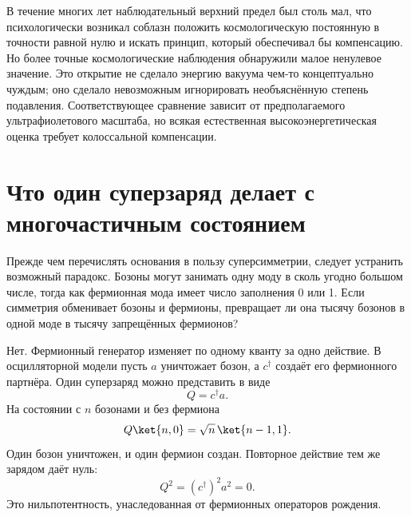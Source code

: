 \begin{classroomqa}
\end{classroomqa}

В течение многих лет наблюдательный верхний предел был столь мал, что психологически возникал соблазн положить космологическую постоянную в точности равной нулю и искать принцип, который обеспечивал бы компенсацию. Но более точные космологические наблюдения обнаружили малое ненулевое значение. Это открытие не сделало энергию вакуума чем-то концептуально чуждым; оно сделало невозможным игнорировать необъяснённую степень подавления. Соответствующее сравнение зависит от предполагаемого ультрафиолетового масштаба, но всякая естественная высокоэнергетическая оценка требует колоссальной компенсации.

\section{Что один суперзаряд делает с многочастичным состоянием}

Прежде чем перечислять основания в пользу суперсимметрии, следует устранить возможный парадокс. Бозоны могут занимать одну моду в сколь угодно большом числе, тогда как фермионная мода имеет число заполнения 0 или 1. Если симметрия обменивает бозоны и фермионы, превращает ли она тысячу бозонов в одной моде в тысячу запрещённых фермионов?

Нет. Фермионный генератор изменяет по одному кванту за одно действие. В осцилляторной модели пусть \(a\) уничтожает бозон, а \(c^\dagger\) создаёт его фермионного партнёра. Один суперзаряд можно представить в виде
\begin{equation}
Q=c^\dagger a.
\end{equation}
На состоянии с \(n\) бозонами и без фермиона
\begin{equation}
Q\ket{n,0}
=\sqrt n\,\ket{n-1,1}.
\end{equation}
Один бозон уничтожен, и один фермион создан. Повторное действие тем же зарядом даёт нуль:
\begin{equation}
Q^2=(c^\dagger)^2a^2=0.
\end{equation}
Это нильпотентность, унаследованная от фермионных операторов рождения.


